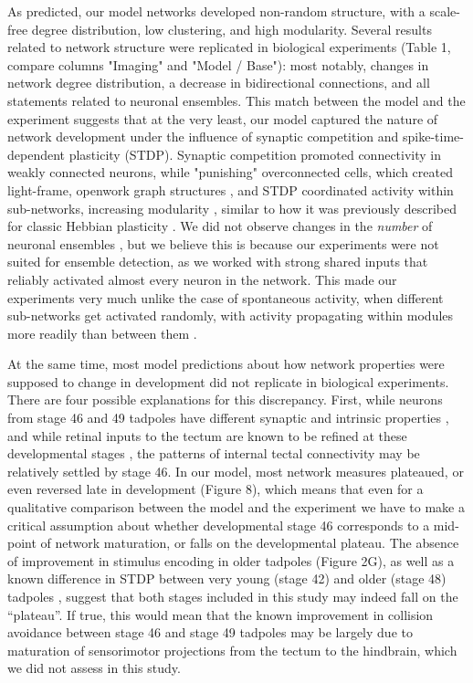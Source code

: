 \documentclass{article}
\begin{document}
As predicted, our model networks developed non-random structure, with a scale-free degree distribution, low clustering, and high modularity. Several results related to network structure were replicated in biological experiments (Table 1, compare columns "Imaging" and "Model / Base"): most notably, changes in network degree distribution, a decrease in bidirectional connections, and all statements related to neuronal ensembles. This match between the model and the experiment suggests that at the very least, our model captured the nature of network development under the influence of synaptic competition and spike-time-dependent plasticity (STDP). Synaptic competition promoted connectivity in weakly connected neurons, while "punishing" overconnected cells, which created light-frame, openwork graph structures \citep{fiete2010chains}, and STDP coordinated activity within sub-networks, increasing modularity \citep{stam2010modular, litwin2014assemblies}, similar to how it was previously described for classic Hebbian plasticity \citep{damicelli2018topomod, triplett2018emergence}. We did not observe changes in the \textit{number} of neuronal ensembles \citep{avitan2017spontaneous, pietri2017emergence}, but we believe this is because our experiments were not suited for ensemble detection, as we worked with strong shared inputs that reliably activated almost every neuron in the network. This made our experiments very much unlike the case of spontaneous activity, when different sub-networks get activated randomly, with activity propagating within modules more readily than between them \citep{avitan2017spontaneous}.

At the same time, most model predictions about how network properties were supposed to change in development did not replicate in biological experiments. There are four possible explanations for this discrepancy. First, while neurons from stage 46 and 49 tadpoles have different synaptic and intrinsic properties \citep{ciarleglio2015}, and while retinal inputs to the tectum are known to be refined at these developmental stages \citep{tao2005refinement, munz2014hebbian}, the patterns of internal tectal connectivity may be relatively settled by stage 46. In our model, most network measures plateaued, or even reversed late in development (Figure 8), which means that even for a qualitative comparison between the model and the experiment we have to make a critical assumption about whether developmental stage 46 corresponds to a mid-point of network maturation, or falls on the developmental plateau. The absence of improvement in stimulus encoding in older tadpoles (Figure 2G), as well as a known difference in STDP between very young (stage 42) and older (stage 48) tadpoles \citep{richards2010stdp, tsui2010developmental}, suggest that both stages included in this study may indeed fall on the “plateau”. If true, this would mean that the known improvement in collision avoidance between stage 46 and stage 49 tadpoles \citep{dong2009} may be largely due to maturation of sensorimotor projections from the tectum to the hindbrain, which we did not assess in this study.
\end{document}
